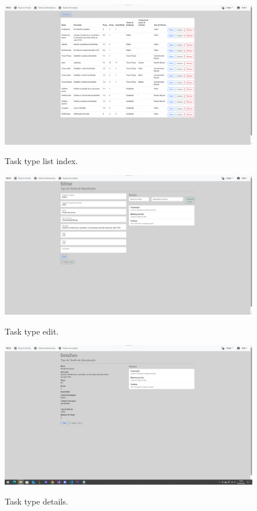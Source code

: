 \begin{figure}[h]
  \caption{Task type list index.}
  \centering
  \includegraphics[width=\textwidth]{figs/Implementation/dealershipAdmin/taskIndex}
  \label{fig:figure2}
\end{figure}

\begin{figure}[h]
  \caption{Task type edit.}
  \centering
  \includegraphics[width=\textwidth]{figs/Implementation/dealershipAdmin/taskEdit}
  \label{fig:figure2}
\end{figure}


\begin{figure}[h]
  \caption{Task type details.}
  \centering
  \includegraphics[width=\textwidth]{figs/Implementation/dealershipAdmin/taskDetails}
  \label{fig:figure2}
\end{figure}

